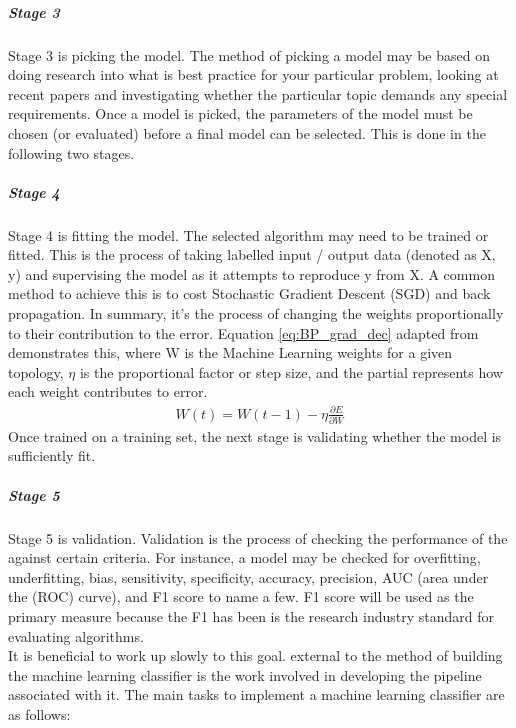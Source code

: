 \documentclass{UoNMCHA}
\numberwithin{equation}{section}
\begin{document}
\subparagraph{Stage 3}
Stage 3 is picking the model. The method of picking a model may be based on doing research into what is best practice for your particular problem, looking at recent papers and investigating whether the particular topic demands any special requirements. Once a model is picked, the parameters of the model must be chosen (or evaluated) before a final model can be selected. This is done in the following two stages.

\subparagraph{Stage 4}
Stage 4 is fitting the model. The selected algorithm may need to be trained or fitted. This is the process of taking labelled input / output data (denoted as X, y) and supervising the model as it attempts to reproduce y from X. A common method to achieve this is to cost Stochastic Gradient Descent (SGD) and back propagation\cite{lecun2012efficient}. In summary, it's the process of changing the weights proportionally to their contribution to the error. Equation \ref{eq:BP_grad_dec} adapted from \cite{lecun2012efficient} demonstrates this, where W is the Machine Learning weights for a given topology, $\eta$ is the proportional factor or step size, and the partial represents how each weight contributes to error.\\

\begin{gather}\label{eq:BP_grad_dec}
    W(t) = W(t-1) - \eta\frac{\partial E}{\partial W} 
\end{gather}
Once trained on a training set, the next stage is validating whether the model is sufficiently fit.

\subparagraph{Stage 5}
Stage 5 is validation. Validation is the process of checking the performance of the against certain criteria. For instance, a model may be checked for overfitting, underfitting, bias, sensitivity, specificity, accuracy, precision, AUC (area under the (ROC) curve), and F1 score to name a few. F1 score will be used as the primary measure because the F1 has been is the research industry standard for evaluating algorithms. \\

It is beneficial to work up slowly to this goal. external to the method of building the machine learning classifier is the work involved in developing the pipeline associated with it. The main tasks to implement a machine learning classifier are as follows:
\end{document}
